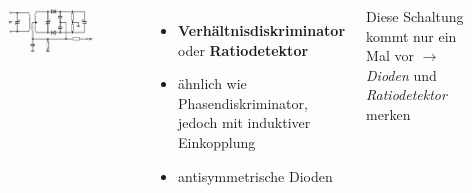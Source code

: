 \begin{frame}
  \begin{columns}
    \begin{figure}
      \includegraphics[width=\textwidth,height=.85\textheight,keepaspectratio]{a12/td508.png}
    \end{figure}
    \begin{itemize}
      \item \textbf{Verhältnisdiskriminator} oder \textbf{Ratiodetektor}
      \item ähnlich wie Phasendiskriminator, jedoch mit induktiver Einkopplung
      \item antisymmetrische Dioden
    \end{itemize}
    {\small Diese Schaltung kommt nur ein Mal vor $\rightarrow$ \emph{Dioden} und \emph{Ratiodetektor} merken}
  \end{columns}
\end{frame}

